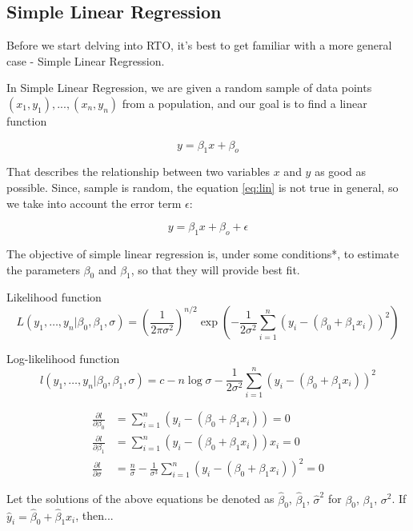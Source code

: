 \documentclass[12pt,a4paper,oneside]{book} %
\begin{document}
	\subsection*{Simple Linear Regression}

Before we start delving into RTO, it's best to get familiar with a more general case - Simple Linear Regression.

In Simple Linear Regression, we are given a random sample of data points $(x_1,y_1),...,(x_n,y_n)$ from a population, and our goal is to find a linear function


\begin{equation}\label{eq:lin}
	y = \beta_1 x + \beta_o
\end{equation}

That describes the relationship between two variables $x$ and $y$ as good as possible. Since, sample is random, the equation \eqref{eq:lin} is not true in general, so we take into account the error term $\epsilon$:

\begin{equation}\label{eq:lin2}
	y = \beta_1 x + \beta_o + \epsilon
\end{equation}


The objective of simple linear regression is, under some  conditions*, to estimate the parameters $\beta_0$ and $\beta_1$, so that they will provide best fit. 


Likelihood function
\[
L(y_1, \ldots, y_n | \beta_0, \beta_1, \sigma) = \left( \frac{1}{2\pi\sigma^2} \right)^{n/2} \exp\left( -\frac{1}{2\sigma^2} \sum_{i=1}^{n} (y_i - (\beta_0 + \beta_1 x_i))^2 \right)
\]

Log-likelihood function
\[
l(y_1, \ldots, y_n | \beta_0, \beta_1, \sigma) = c - n \log \sigma - \frac{1}{2\sigma^2} \sum_{i=1}^{n} (y_i - (\beta_0 + \beta_1 x_i))^2
\]


\begin{align}
	\frac{\partial l}{\partial \beta_0} &= \sum_{i=1}^{n} (y_i - (\beta_0 + \beta_1 x_i)) = 0 \label{eq:est_beta_0} \\
	\frac{\partial l}{\partial \beta_1} &= \sum_{i=1}^{n} (y_i - (\beta_0 + \beta_1 x_i))x_i = 0 \label{eq:est_beta_1} \\
	\frac{\partial l}{\partial \sigma} &= \frac{n}{\sigma} - \frac{1}{\sigma^3} \sum_{i=1}^{n} (y_i - (\beta_0 + \beta_1 x_i))^2 = 0 
\end{align}
	

Let the solutions of the above equations be denoted as $\hat{\beta}_0$, $\hat{\beta}_1$, $\hat{\sigma}^2$ for $\beta_0$, $\beta_1$, $\sigma^2$. If $\hat{y}_i = \hat{\beta}_0 + \hat{\beta}_1 x_i$, then...
\end{document}
